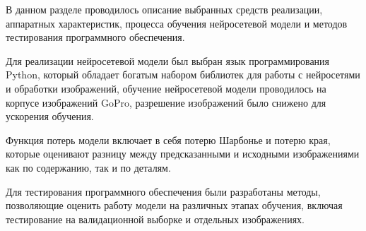 В данном разделе проводилось описание выбранных средств реализации, аппаратных характеристик, процесса обучения нейросетевой модели и методов тестирования программного обеспечения.

Для реализации нейросетевой модели был выбран язык программирования Python, который обладает богатым набором библиотек для работы с нейросетями и обработки изображений, обучение нейросетевой модели проводилось на корпусе изображений GoPro, разрешение изображений было снижено для ускорения обучения.

Функция потерь модели включает в себя потерю Шарбонье и потерю края, которые оценивают разницу между предсказанными и исходными изображениями как по содержанию, так и по деталям.

Для тестирования программного обеспечения были разработаны методы, позволяющие оценить работу модели на различных этапах обучения, включая тестирование на валидационной выборке и отдельных изображениях.